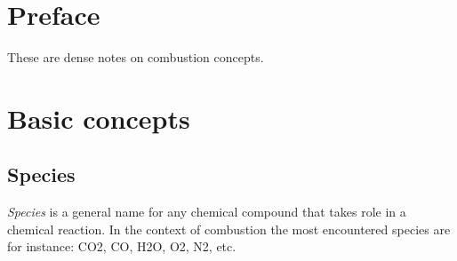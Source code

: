 \documentclass[10pt,twocolumn]{article}
\begin{document}

\vspace{10mm}

\setlength{\parindent}{0cm}


\section*{Preface}

These are dense notes on combustion concepts.


\tableofcontents

\newpage

\section{Basic concepts}

\subsection{Species}

\textit{Species} is a general name for any chemical compound that takes role in a chemical reaction. In the context of combustion the most encountered species are for instance: CO2, CO, H2O, O2, N2, etc.
\end{document}
